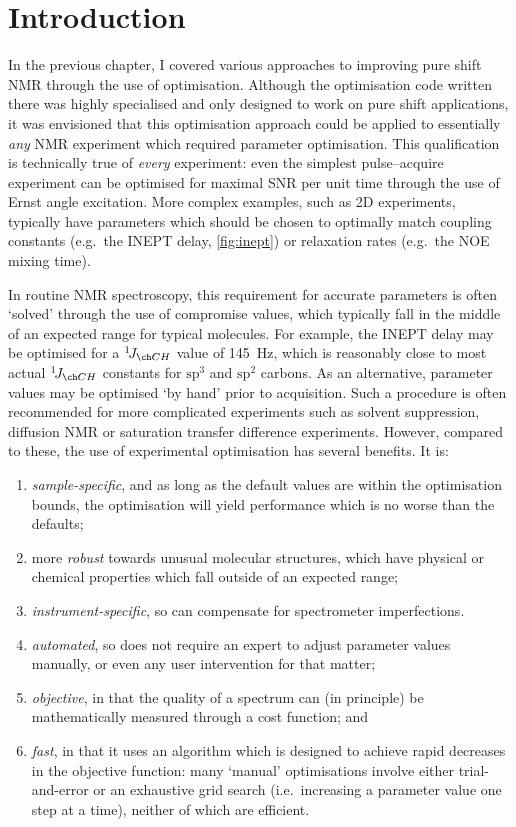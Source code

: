\section{Introduction}
\label{sec:poise__introduction}

In the previous chapter, I covered various approaches to improving pure shift NMR through the use of optimisation.
Although the optimisation code written there was highly specialised and only designed to work on pure shift applications, it was envisioned that this optimisation approach could be applied to essentially \textit{any} NMR experiment which required parameter optimisation.
This qualification is technically true of \textit{every} experiment: even the simplest pulse--acquire experiment can be optimised for maximal SNR per unit time through the use of Ernst angle excitation.
More complex examples, such as 2D experiments, typically have parameters which should be chosen to optimally match coupling constants (e.g.\ the INEPT delay, \cref{fig:inept}) or relaxation rates (e.g.\ the NOE mixing time).

In routine NMR spectroscopy, this requirement for accurate parameters is often `solved' through the use of compromise values, which typically fall in the middle of an expected range for typical molecules.
For example, the INEPT delay may be optimised for a $\oneJ{CH}$ value of \qty{145}{\Hz}, which is reasonably close to most actual $\oneJ{CH}$ constants for $\mathrm{sp^3}$ and $\mathrm{sp^2}$ carbons.
As an alternative, parameter values may be optimised `by hand' prior to acquisition.
Such a procedure is often recommended for more complicated experiments such as solvent suppression, diffusion NMR or saturation transfer difference experiments.
However, compared to these, the use of experimental optimisation has several benefits.
It is:
\begin{enumerate}
    \item \textit{sample-specific}, and as long as the default values are within the optimisation bounds, the optimisation will yield performance which is no worse than the defaults;
    \item more \textit{robust} towards unusual molecular structures, which have physical or chemical properties which fall outside of an expected range;
    \item \textit{instrument-specific}, so can compensate for spectrometer imperfections.
    \item \textit{automated}, so does not require an expert to adjust parameter values manually, or even any user intervention for that matter;
    \item \textit{objective}, in that the quality of a spectrum can (in principle) be mathematically measured through a cost function; and
    \item \textit{fast}, in that it uses an algorithm which is designed to achieve rapid decreases in the objective function: many `manual' optimisations involve either trial-and-error or an exhaustive grid search (i.e.\ increasing a parameter value one step at a time), neither of which are efficient.
\end{enumerate}

